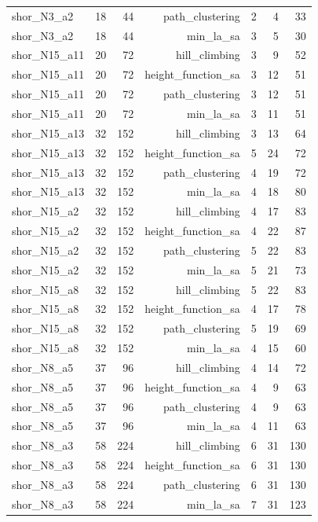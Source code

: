 \begin{longtable}{lrrrrrr}
  shor\_N3\_a2 & 18 & 44 & path\_clustering & 2 & 4 & 33 \\
  shor\_N3\_a2 & 18 & 44 & min\_la\_sa & 3 & 5 & 30 \\
  shor\_N15\_a11 & 20 & 72 & hill\_climbing & 3 & 9 & 52 \\
  shor\_N15\_a11 & 20 & 72 & height\_function\_sa & 3 & 12 & 51 \\
  shor\_N15\_a11 & 20 & 72 & path\_clustering & 3 & 12 & 51 \\
  shor\_N15\_a11 & 20 & 72 & min\_la\_sa & 3 & 11 & 51 \\
  shor\_N15\_a13 & 32 & 152 & hill\_climbing & 3 & 13 & 64 \\
  shor\_N15\_a13 & 32 & 152 & height\_function\_sa & 5 & 24 & 72 \\
  shor\_N15\_a13 & 32 & 152 & path\_clustering & 4 & 19 & 72 \\
  shor\_N15\_a13 & 32 & 152 & min\_la\_sa & 4 & 18 & 80 \\
  shor\_N15\_a2 & 32 & 152 & hill\_climbing & 4 & 17 & 83 \\
  shor\_N15\_a2 & 32 & 152 & height\_function\_sa & 4 & 22 & 87 \\
  shor\_N15\_a2 & 32 & 152 & path\_clustering & 5 & 22 & 83 \\
  shor\_N15\_a2 & 32 & 152 & min\_la\_sa & 5 & 21 & 73 \\
  shor\_N15\_a8 & 32 & 152 & hill\_climbing & 5 & 22 & 83 \\
  shor\_N15\_a8 & 32 & 152 & height\_function\_sa & 4 & 17 & 78 \\
  shor\_N15\_a8 & 32 & 152 & path\_clustering & 5 & 19 & 69 \\
  shor\_N15\_a8 & 32 & 152 & min\_la\_sa & 4 & 15 & 60 \\
  shor\_N8\_a5 & 37 & 96 & hill\_climbing & 4 & 14 & 72 \\
  shor\_N8\_a5 & 37 & 96 & height\_function\_sa & 4 & 9 & 63 \\
  shor\_N8\_a5 & 37 & 96 & path\_clustering & 4 & 9 & 63 \\
  shor\_N8\_a5 & 37 & 96 & min\_la\_sa & 4 & 11 & 63 \\
  shor\_N8\_a3 & 58 & 224 & hill\_climbing & 6 & 31 & 130 \\
  shor\_N8\_a3 & 58 & 224 & height\_function\_sa & 6 & 31 & 130 \\
  shor\_N8\_a3 & 58 & 224 & path\_clustering & 6 & 31 & 130 \\
  shor\_N8\_a3 & 58 & 224 & min\_la\_sa & 7 & 31 & 123 \\

\end{longtable}
